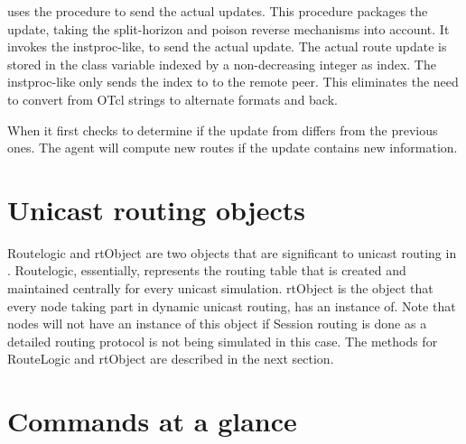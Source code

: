  uses the procedure
to send the actual updates.
This procedure packages the update, taking the
split-horizon and poison reverse mechanisms into account.
It invokes the instproc-like,
to send the actual update.
The actual route update is stored in the class variable
 indexed by a non-decreasing integer as index.
The instproc-like only sends the index to  to the remote peer.
This eliminates the need to convert from OTcl strings to alternate formats
and back.

When 
it first checks to determine if the update from differs from the previous
ones.
The agent will compute new routes if the update contains new information.


\section{Unicast routing objects}
\label{sec:routeobjects}

Routelogic and rtObject are two objects that are significant to unicast
routing in \ns. Routelogic, essentially, represents the routing table
that is created and maintained centrally for every unicast simulation.
rtObject is the object that every node taking part in dynamic
unicast routing, has an instance of. Note that nodes will not have an
instance of this object if Session routing is done as a detailed
routing protocol is not being simulated in this case. The methods for
RouteLogic and rtObject are described in the next section.


\section{Commands at a glance}
\label{sec:unicastcommand}

